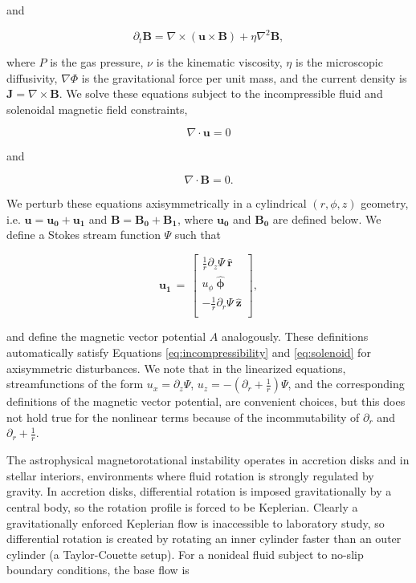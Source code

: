 \documentclass{emulateapj}
\newcommand{\beq}{\begin{equation}}
\newcommand{\eeq}{\end{equation}}
\newcommand{\uphi}{\ensuremath{u_\phi}}
\newcommand{\rhat}{\ensuremath{\mathbf{\hat{r}}}}
\newcommand{\phihat}{\ensuremath{\mathbf{\hat{\phi}}}}
\newcommand{\zhat}{\ensuremath{\mathbf{\hat{z}}}}
\begin{document}
and

\beq\label{induction}
\partial_t \mathbf{B} = \nabla \times \left(\mathbf{u} \times \mathbf{B}\right) + \eta\nabla^2\mathbf{B},
\eeq

where $P$ is the gas pressure, $\nu$ is the kinematic viscosity, $\eta$ is the microscopic diffusivity, $\nabla\Phi$ is the gravitational force per unit mass, and the current density is $\mathbf{J} = \nabla\times\mathbf{B}$. We solve these equations subject to the incompressible fluid and solenoidal magnetic field constraints,

\beq
\label{eq:incompressibility}
\nabla \cdot \mathbf{u} = 0
\eeq

and 

\beq
\label{eq:solenoid}
\nabla \cdot \mathbf{B} = 0.
\eeq

We perturb these equations axisymmetrically in a cylindrical $(r, \phi, z)$ geometry, i.e. $\mathbf{u} = \mathbf{u_0} + \mathbf{u_1}$ and $\mathbf{B} = \mathbf{B_0} + \mathbf{B_1}$, where $\mathbf{u_0}$ and $\mathbf{B_0}$ are defined below. We define a Stokes stream function $\Psi$ such that 

\beq
  \label{eq:stokes}
  \mathbf{u_1} \, = \, \left[\begin{matrix}
\frac{1}{r} \partial_z \Psi\ \rhat\\
\uphi \ \phihat\\
-\frac{1}{r} \partial_r \Psi\ \zhat\\
\end{matrix}\right],
\eeq

and define the magnetic vector potential $A$ analogously. These definitions automatically satisfy Equations \ref{eq:incompressibility} and \ref{eq:solenoid} for axisymmetric disturbances. We note that in the linearized equations, streamfunctions of the form $u_x = \partial_z \Psi$, $u_z = -(\partial_r + \frac{1}{r}) \Psi$, and the corresponding definitions of the magnetic vector potential, are convenient choices, but this does not hold true for the nonlinear terms because of the incommutability of $\partial_r$ and $\partial_r + \frac{1}{r}$. 

The astrophysical magnetorotational instability operates in accretion disks and in stellar interiors, environments where fluid rotation is strongly regulated by gravity. In accretion disks, differential rotation is imposed gravitationally by a central body, so the rotation profile is forced to be Keplerian. Clearly a gravitationally enforced Keplerian flow is inaccessible to laboratory study, so differential rotation is created by rotating an inner cylinder faster than an outer cylinder (a Taylor-Couette setup). For a nonideal fluid subject to no-slip boundary conditions, the base flow is
\end{document}
